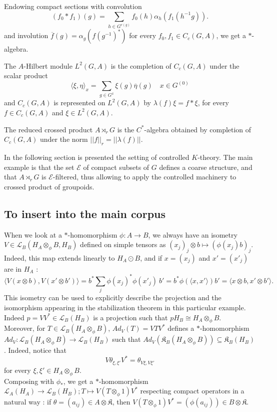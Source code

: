 Endowing compact sections with convolution
\[(f_0\ast f_1)(g) = \sum_{h\in G^{r(g)}} f_0(h) \alpha_h(f_1(h^{-1}g)).\]
and involution $\overline f(g)=\alpha_g(f(g^{-1})^*)$ for every $f_0,f_1\in C_c(G,A)$, we get a $*$-algebra. 

The $A$-Hilbert module $L^2(G,A)$ is the completion of $C_c(G,A)$ under the scalar product 
\[\langle \xi ,\eta \rangle_x  = \sum_{g\in G^x} \xi(g)\overline \eta(g) \quad x\in G^{(0)} \]
and $C_c(G,A)$ is represented on $L^2(G,A)$ by $\lambda(f) \xi = f\ast \xi$, for every $ f\in C_c(G,A)$ and $\xi\in L^2(G,A)$.\\

\begin{definition}
The reduced crossed product $A\rtimes_r G$ is the $C^*$-algebra obtained by completion of $C_c(G,A)$ under the norm $||f||_r=||\lambda(f)||$.
\end{definition}

In the following section is presented the setting of controlled $K$-theory. The main example is that the set $\mathcal E$ of compact subsets of $G$ defines a coarse structure, and that $A\rtimes_r G$ is $\mathcal E$-filtered, thus allowing to apply the controlled machinery to crossed product of groupoids. 


\subsection{To insert into the main corpus}

\begin{rk}\label{isometry}
When we look at a $*$-homomorphism $\phi : A\rightarrow B$, we always have an isometry $V\in \mathcal L_B ( H_A\otimes_\phi B , H_B)$ defined on simple tensors as $(x_j)_j\otimes b \mapsto (\phi(x_j)b)_j$. Indeed, this map extends linearly to $H_A \odot B$, and if $x = (x_j)$ and $x'=(x'_j)$ are in $H_A$ : 
\[\langle V (x\otimes b) , V(x'\otimes b')\rangle = b^* \sum_j \phi(x_j)^* \phi(x'_j) \  b' = b^*\phi(\langle x, x' \rangle)b' = \langle x\otimes b , x'\otimes b' \rangle . \] %
This isometry can be used to explicitly describe the projection and the isomorphism appearing in the stabilization theorem in this particular example. Indeed $p = VV^*\in\mathcal L_B(H_B)$ is a projection such that $p H_B \cong H_A\otimes_\phi B $.\\

Moreover, for $T\in \mathcal L_B(H_A\otimes_\phi B)$, $Ad_V(T) = VTV^*$ defines a $*$-homomorphism $Ad_V : \mathcal L_B(H_A\otimes_\phi B)\rightarrow \mathcal L_B(H_B)$ such that $Ad_V(\mathfrak K_B(H_A\otimes_\phi B))\subseteq \mathfrak K_B(H_B)$. Indeed, notice that 
\[V\theta_{\xi,\xi'}V^* = \theta_{V\xi,V\xi'}\]
for every $\xi,\xi'\in H_A\otimes_\phi B$.\\

Composing with $\phi_*$, we get a $*$-homomorphism $\mathcal L_A(H_A)\rightarrow \mathcal L_B(H_B); T\mapsto V(T\otimes_\phi 1)V^*$ respecting compact operators in a natural way : if $\theta = (a_{ij})\in A\otimes\mathfrak K$, then $V(T\otimes_\phi 1)V^* = (\phi(a_{ij}))\in B\otimes\mathfrak K$.  
\end{rk}

